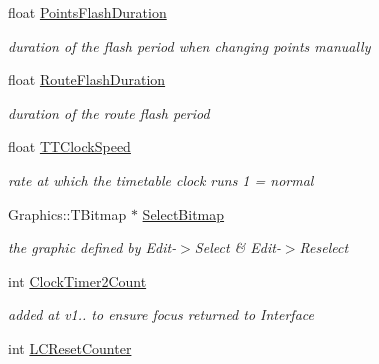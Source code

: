\begin{DoxyCompactItemize}
float \mbox{\hyperlink{class_t_interface_a19373a8d9b089feaf0c68f3f2e21864b}{Points\+Flash\+Duration}}
\begin{DoxyCompactList}\small\item\em duration of the flash period when changing points manually \end{DoxyCompactList}\item 
\mbox{\label{class_t_interface_a0df2d6af5d41d428ad35892aea82098c}} 
float \mbox{\hyperlink{class_t_interface_a0df2d6af5d41d428ad35892aea82098c}{Route\+Flash\+Duration}}
\begin{DoxyCompactList}\small\item\em duration of the route flash period \end{DoxyCompactList}\item 
\mbox{\label{class_t_interface_aa6c357f4fb2a415dd9afe2f8b64146b7}} 
float \mbox{\hyperlink{class_t_interface_aa6c357f4fb2a415dd9afe2f8b64146b7}{T\+T\+Clock\+Speed}}
\begin{DoxyCompactList}\small\item\em rate at which the timetable clock runs 1 = normal \end{DoxyCompactList}\item 
\mbox{\label{class_t_interface_ab6a299c76cfb2b9c8e9e6966133b56a3}} 
Graphics\+::\+T\+Bitmap $\ast$ \mbox{\hyperlink{class_t_interface_ab6a299c76cfb2b9c8e9e6966133b56a3}{Select\+Bitmap}}
\begin{DoxyCompactList}\small\item\em the graphic defined by Edit-\/$>$Select \& Edit-\/$>$Reselect \end{DoxyCompactList}\item 
\mbox{\label{class_t_interface_a039907015f5174600f6020bd0a8ab7d1}} 
int \mbox{\hyperlink{class_t_interface_a039907015f5174600f6020bd0a8ab7d1}{Clock\+Timer2\+Count}}
\begin{DoxyCompactList}\small\item\em added at v1.. to ensure focus returned to Interface \end{DoxyCompactList}\item 
\mbox{\label{class_t_interface_a49670c19087423dc9ea68b5b6169a92b}} 
int \mbox{\hyperlink{class_t_interface_a49670c19087423dc9ea68b5b6169a92b}{L\+C\+Reset\+Counter}}

\end{DoxyCompactItemize}
